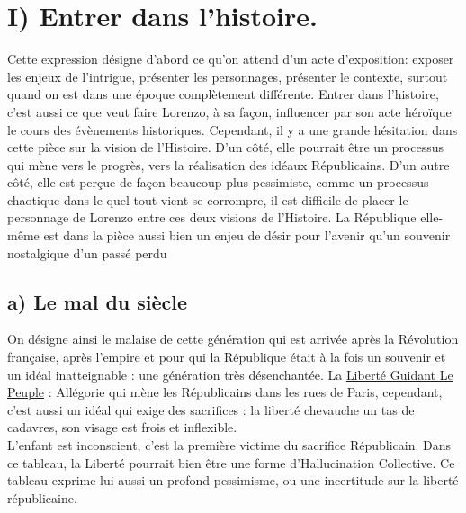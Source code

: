 \documentclass[12pt]{article}
\begin{document}
\section*{\color{red}I) Entrer dans l'histoire.}
Cette expression désigne d'abord ce qu'on attend d'un acte d'exposition: exposer les enjeux de l'intrigue, présenter les personnages, présenter le contexte, surtout quand on est dans une époque complètement différente.
Entrer dans l'histoire, c'est aussi ce que veut faire Lorenzo, à sa façon, influencer par son acte héroïque le cours des évènements historiques.
Cependant, il y a une grande hésitation dans cette pièce sur la vision de l'Histoire.
D'un côté, elle pourrait être un processus qui mène vers le progrès, vers la réalisation des idéaux Républicains.
D'un autre côté, elle est perçue de façon beaucoup plus pessimiste, comme un processus chaotique dans le quel tout vient se corrompre, il est difficile de placer le personnage de Lorenzo entre ces deux visions de l'Histoire.
La République elle-même est dans la pièce aussi bien un enjeu de désir pour l'avenir qu'un souvenir nostalgique d'un passé perdu
\subsection*{a) Le mal du siècle}
On désigne ainsi le malaise de cette génération qui est arrivée après la Révolution française, après l'empire et pour qui la République était à la fois un souvenir et un idéal inatteignable : une génération très désenchantée.
La \underline{Liberté Guidant Le Peuple} : Allégorie qui mène les Républicains dans les rues de Paris, cependant, c'est aussi un idéal qui exige des sacrifices : la liberté chevauche un tas de cadavres, son visage est frois et inflexible.\\
L'enfant est inconscient, c'est la première victime du sacrifice Républicain. Dans ce tableau, la Liberté pourrait bien être une forme d'Hallucination Collective. Ce tableau exprime lui aussi un profond pessimisme, ou une incertitude sur la liberté républicaine.
\end{document}
